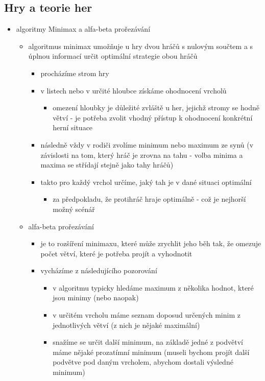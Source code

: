 \subsection{Hry a teorie her}
\begin{itemize}
\item algoritmy Minimax a alfa-beta prořezávání
\begin{itemize}
\item algoritmus minimax umožňuje u hry dvou hráčů s nulovým součtem a s úplnou informací určit optimální strategie obou hráčů
\begin{itemize}
\item procházíme strom hry
\item v listech nebo v určité hloubce získáme ohodnocení vrcholů
\begin{itemize}
\item omezení hloubky je důležité zvláště u her, jejichž stromy se hodně větví - je potřeba zvolit vhodný přístup k ohodnocení konkrétní herní situace
\end{itemize}
\item následně vždy v rodiči zvolíme minimum nebo maximum ze synů (v závislosti na tom, který hráč je zrovna na tahu - volba minima a maxima se střídají stejně jako tahy hráčů)
\item takto pro každý vrchol určíme, jaký tah je v dané situaci optimální
\begin{itemize}
\item za předpokladu, že protihráč hraje optimálně - což je nejhorší možný scénář
\end{itemize}
\end{itemize}
\item alfa-beta prořezávání
\begin{itemize}
\item je to rozšíření minimaxu, které může zrychlit jeho běh tak, že omezuje počet větví, které je potřeba projít a vyhodnotit
\item vycházíme z následujícího pozorování
\begin{itemize}
\item v algoritmu typicky hledáme maximum z několika hodnot, které jsou minimy (nebo naopak)
\item v určitém vrcholu máme seznam doposud určených minim z jednotlivých větví (z nich je nějaké maximální)
\item snažíme se určit další minimum, na základě jedné z podvětví máme nějaké prozatímní minimum (museli bychom projít další podvětve pod daným vrcholem, abychom dostali výsledné minimum)

\end{itemize}
\end{itemize}
\end{itemize}
\end{itemize}

